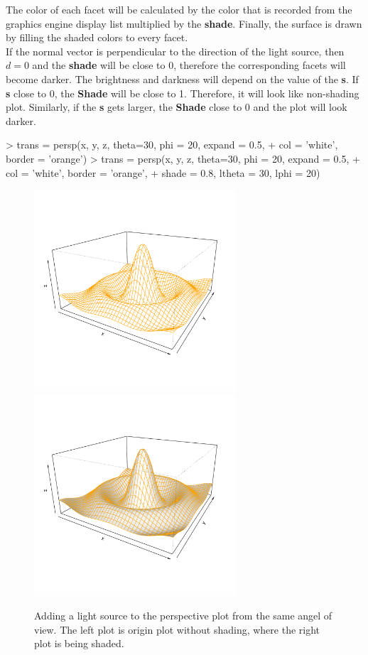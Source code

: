 \documentclass[11pt,twoside]{report}
\begin{document}
The color of each facet will be calculated by the color that is recorded from the graphics engine display list multiplied by the \textbf{shade}. Finally, the surface is drawn by filling the shaded colors to every facet.\\

If the normal vector is perpendicular to the direction of the light source, then $d = 0$ and the \textbf{shade} will be close to 0, therefore the corresponding facets will become darker. The brightness and darkness will depend on the value of the \textbf{s}. If \textbf{s} close to 0, the \textbf{Shade} will be close to 1. Therefore, it will look like non-shading plot. Similarly, if the \textbf{s} gets larger, the \textbf{Shade} close to 0 and the plot will look darker.

\begin{Schunk}
\begin{Sinput}
> trans = persp(x, y, z, theta=30, phi = 20, expand = 0.5,
+               col = 'white', border = 'orange')
> trans = persp(x, y, z, theta=30, phi = 20, expand = 0.5,
+               col = 'white', border = 'orange', 
+               shade = 0.8, ltheta = 30, lphi = 20)
\end{Sinput}
\end{Schunk}


\begin{figure}[h]
	\begin{center}
		\includegraphics[height = 7.5cm, width = 7.5cm]{figure/Lighting_1.pdf}
		\includegraphics[height = 7.5cm, width = 7.5cm]{figure/Lighting_2.pdf}
		\caption{Adding a light source to the perspective plot from the same angel of view. The left plot is origin plot without shading, where the right plot is being shaded.}
		\label{figure_3.3}
	\end{center}
\end{figure}
\end{document}
